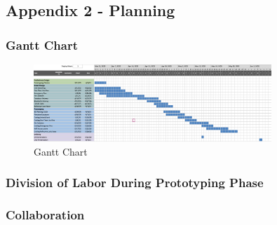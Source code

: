 
\newpage

    \subsection{Appendix 2 - Planning}
    \subsubsection{Gantt Chart}

    \begin{figure}[!ht]
    \centering
    \includegraphics[width=0.80\textwidth]{img/ganttchart.png}
    \caption{Gantt Chart}
    \label{fig:ganttchart}
\end{figure}


\subsubsection{Division of Labor During Prototyping Phase}
\subsubsection{Collaboration}

